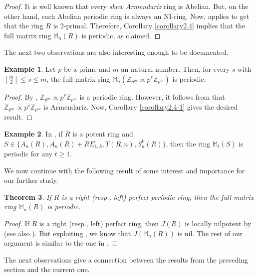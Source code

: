 \documentclass[12pt]{amsart}
\newtheorem{thm}{Theorem}[section]
\theoremstyle{definition}
\newtheorem{ex}[thm]{Example}
\theoremstyle{remark}
\numberwithin{equation}{section}
\begin{document}
\begin{proof}
It is well known that every \textit{skew Armendariz} ring is Abelian. But, on the other hand, each Abelian periodic ring is always an NI-ring. Now, \cite[Theorem 2.8]{Nasr-Isfahani} applies to get that the ring $R$ is $2$-primal. Therefore, Corollary \ref{corollary2.4} implies that the full matrix ring $\mathbb{M}_n(R)$ is periodic, as claimed.
\end{proof}

The next two observations are also interesting enough to be documented.

\begin{ex}
Let $p$ be a prime and $m$ an natural number. Then, for every $s$ with $[\frac{m}{2}] \leq s \leq m$, the full matrix ring $\mathbb{M}_n(\mathbb{Z}_{p^m} \propto p^s\mathbb{Z}_{p^m})$ is periodic.
\end{ex}

\begin{proof}
By \cite[Theorem 2.13]{BCL}, $\mathbb{Z}_{p^m} \propto p^s\mathbb{Z}_{p^m}$ is a periodic ring. However, it follows from \cite[Corollary 2.8]{LeeZhou} that $\mathbb{Z}_{p^m} \propto p^s\mathbb{Z}_{p^m}$ is Armendariz. Now, Corollary \ref{corollary2.4-1} gives the desired result.
\end{proof}

\begin{ex}
In \cite[Example 1.7]{BM}, if $R$ is a potent ring and $S\in \{A_n(R),A_n(R)+RE_{1,k},T(R,n),S_n^k(R)\}$, then the ring $\mathbb{M}_t(S)$ is periodic for any $t \geq 1$.
\end{ex}

We now continue with the following result of some interest and importance for our further study.

\begin{thm}\label{theorem2.5}
If $R$ is a right (resp., left) perfect periodic ring, then the full matrix ring $\mathbb{M}_n(R)$ is periodic.
\end{thm}

\begin{proof}
If $R$ is a right (resp., left) perfect ring, then $J(R)$ is locally nilpotent by \cite[Proposition 23.15]{L} (see also \cite[Ex. 23.1]{L}). But exploiting \cite[Proposition 1.1]{BM}, we know that $J(\mathbb{M}_n(R))$ is nil. The rest of our argument is similar to the one in \cite[Proposition 2.18]{BCL}.
\end{proof}

The next observations give a connection between the results from the preceding section and the current one.
\end{document}
